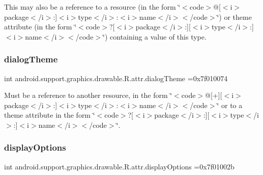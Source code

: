 This may also be a reference to a resource (in the form \char`\"{}$<$code$>$@\mbox{[}$<$i$>$package$<$/i$>$\+:\mbox{]}$<$i$>$type$<$/i$>$\+:$<$i$>$name$<$/i$>$$<$/code$>$\char`\"{}) or theme attribute (in the form \char`\"{}$<$code$>$?\mbox{[}$<$i$>$package$<$/i$>$\+:\mbox{]}\mbox{[}$<$i$>$type$<$/i$>$\+:\mbox{]}$<$i$>$name$<$/i$>$$<$/code$>$\char`\"{}) containing a value of this type. \mbox{\label{classandroid_1_1support_1_1graphics_1_1drawable_1_1R_1_1attr_a56b0592441b0ef3d71513073e1c7fd55}} 
\subsubsection{\texorpdfstring{dialog\+Theme}{dialogTheme}}
{\footnotesize\ttfamily int android.\+support.\+graphics.\+drawable.\+R.\+attr.\+dialog\+Theme =0x7f010074\hspace{0.3cm}{\ttfamily [static]}}

Must be a reference to another resource, in the form \char`\"{}$<$code$>$@\mbox{[}+\mbox{]}\mbox{[}$<$i$>$package$<$/i$>$\+:\mbox{]}$<$i$>$type$<$/i$>$\+:$<$i$>$name$<$/i$>$$<$/code$>$\char`\"{} or to a theme attribute in the form \char`\"{}$<$code$>$?\mbox{[}$<$i$>$package$<$/i$>$\+:\mbox{]}\mbox{[}$<$i$>$type$<$/i$>$\+:\mbox{]}$<$i$>$name$<$/i$>$$<$/code$>$\char`\"{}. \mbox{\label{classandroid_1_1support_1_1graphics_1_1drawable_1_1R_1_1attr_aaac1762d1c3eb6018780b70a36631012}} 
\subsubsection{\texorpdfstring{display\+Options}{displayOptions}}
{\footnotesize\ttfamily int android.\+support.\+graphics.\+drawable.\+R.\+attr.\+display\+Options =0x7f01002b\hspace{0.3cm}{\ttfamily [static]}}

